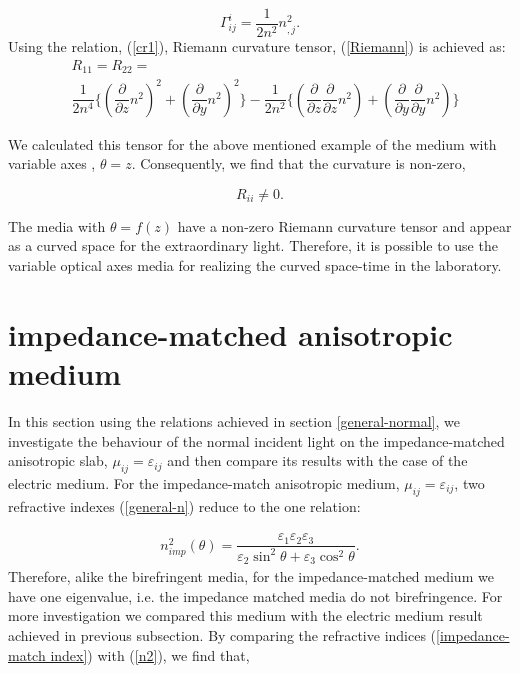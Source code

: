 \documentclass[9pt,twocolumn,twoside]{osajnl}
\begin{document}
\begin{equation}\label{cr1}
\Gamma^{i}_{ij}=\dfrac{1}{2n^{2}}n^{2}_{,j}.
\end{equation}
Using the relation, (\ref{cr1}), Riemann curvature tensor, (\ref{Riemann}) is achieved as:
\begin{equation}

\begin{split}
&R_{11}=R_{22}=\\
&\dfrac{1}{2n^{4}} \lbrace (\dfrac{\partial}{\partial z}n^{2})^{2} +(\dfrac{\partial}{\partial y}n^{2})^{2}\rbrace -\dfrac{1}{2n^{2}}\lbrace(\dfrac{\partial}{\partial z}\dfrac{\partial}{\partial z}n^{2})+(\dfrac{\partial}{\partial y}\dfrac{\partial}{\partial y}n^{2})\rbrace
\end{split}
\end{equation}

We calculated this tensor for the above mentioned example of the medium with variable axes , $\theta=z$. Consequently, we find that the  curvature is non-zero,

 \begin{equation}
R_{ii}\neq 0.
\end{equation}

The media with $\theta=f(z)$ have a non-zero Riemann curvature tensor and appear as a curved space for the extraordinary light. Therefore, it is possible to use the variable optical axes media for realizing the curved space-time in the laboratory. 

\section{impedance-matched anisotropic medium}\label{impedance-matched}
In this section using the relations achieved in section \ref{general-normal}, we investigate the behaviour of the normal incident light on the impedance-matched anisotropic slab, $ \mu_{ij} =\varepsilon_{ij} $ and then compare its results with the case of the electric medium.
For the impedance-match anisotropic medium,  $ \mu_{ij} =\varepsilon_{ij} $,  two refractive indexes (\ref{general-n}) reduce to the one relation:

\begin{align}\label{impedance-match index}
n_{imp}^{2}(\theta)=\dfrac{\varepsilon_{1}\varepsilon_{2}\varepsilon_{3}}{\varepsilon_{2}\sin^{2}{\theta}+\varepsilon_{3}\cos^{2}{\theta}}.
\end{align}
Therefore, alike the birefringent media, for the impedance-matched medium we have one eigenvalue, i.e. the impedance matched media do not birefringence. For more investigation we compared this medium with the electric medium result achieved in previous subsection. By comparing the refractive indices (\ref{impedance-match index}) with (\ref{n2}), we find that,
\end{document}
